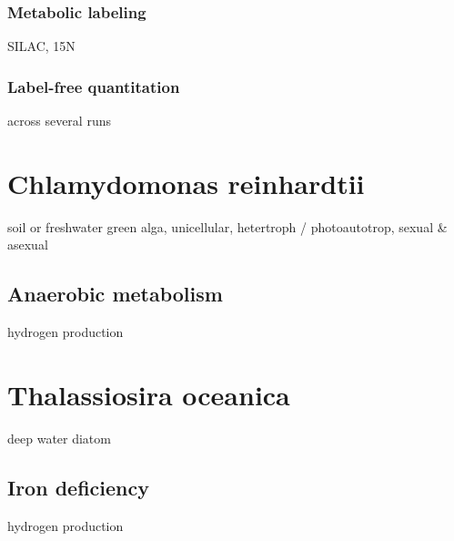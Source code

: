 \subsubsection{Metabolic labeling}

\begin{todo}
SILAC, 15N
\end{todo}

\subsubsection{Label-free quantitation}

\begin{todo}
across several runs
\end{todo}

\section{Chlamydomonas reinhardtii}

\begin{todo}
soil or freshwater green alga, unicellular, hetertroph / photoautotrop, sexual & asexual
\end{todo}

\subsection{Anaerobic metabolism}

\begin{todo}
hydrogen production
\end{todo}

\section{Thalassiosira oceanica}

\begin{todo}
deep water diatom
\end{todo}

\subsection{Iron deficiency}

\begin{todo}
hydrogen production
\end{todo}
